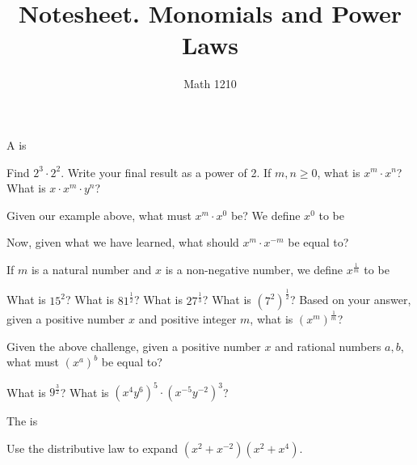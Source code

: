 \documentclass[12pt, a4paper]{article}
\author{Math 1210}
\title{Notesheet. Monomials and Power Laws}
\date{}
\begin{document}
\maketitlee
\nameline
\begin{defi}
  A  is
\end{defi}
\begin{ex}
  Find \(2^3 \cdot 2^2\). Write your final result as a power of 2. If
  \(m,n \geq 0\), what is \(x^m \cdot x^n\)? What is \(x \cdot x^m
  \cdot y^n\)?
\end{ex}
\begin{defi}
  Given our example above, what must \(x^m \cdot x^0\) be? We define
  \(x^0\) to be
\end{defi}
\begin{ex}
  Now, given what we have learned, what should \(x^m \cdot x^{-m}\) be
  equal to?
\end{ex}
\begin{defi}
  If \(m\) is a natural number and \(x\) is a non-negative number, we
  define \(x^{\frac{1}{m}}\) to be
\end{defi}
\begin{ex}
  What is \(15^2\)? What is \(81^{\frac{1}{2}}\)? What is
  \(27^{\frac{1}{3}}\)? What is
  \((7^2)^{\frac{1}{2}}\)? Based on your answer, given a positive
  number \(x\) and positive integer \(m\), what is
  \((x^m)^{\frac{1}{m}}\)?
\end{ex}
\begin{defi}
  Given the above challenge, given a positive number \(x\) and
  rational numbers \(a,b\), what must \((x^a)^b\) be equal to?
\end{defi}
\begin{ex}
  What is \(9^{\frac{3}{2}}\)? What is \((x^4y^6)^5 \cdot
  (x^{-5}y^{-2})^{3}\)?
\end{ex}
\begin{defi}
  The  is
\end{defi}
\begin{ex}
  Use the distributive law to expand \((x^2+x^{-2})(x^2+x^4)\).
\end{ex}
\end{document}
